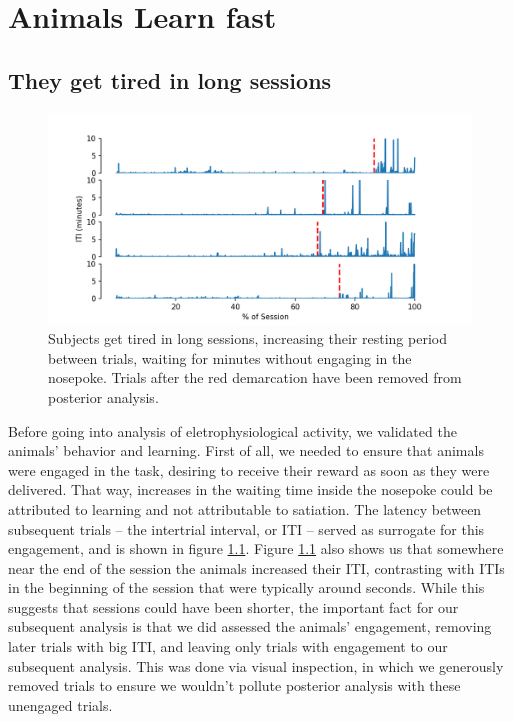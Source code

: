 \chapter{Animals Learn fast}
\label{chap:learning}

\section{They get tired in long sessions}
    \begin{figure}
        \centering
        \includegraphics[width=\textwidth]{figures/iti.png}
        \caption[Subjects get tired in long sessions]{Subjects get tired in long sessions, increasing their resting period between trials, waiting for minutes without engaging in the nosepoke. Trials after the red demarcation have been removed from posterior analysis.}
        \label{fig:iti}
    \end{figure}
    
    Before going into analysis of eletrophysiological activity, we validated the animals' behavior and learning. First of all, we needed to ensure that animals were engaged in the task, desiring to receive their reward as soon as they were delivered. That way, increases in the waiting time inside the nosepoke could be attributed to learning and not attributable to satiation. The latency between subsequent trials -- the intertrial interval, or ITI --  served as surrogate for this engagement, and is shown in figure \ref{fig:iti}. 
    Figure \ref{fig:iti} also shows us that somewhere near the end of the session the animals increased their ITI, contrasting with ITIs in the beginning of the session that were typically around seconds. While this suggests that sessions could have been shorter, the important fact for our subsequent analysis is that we did assessed the animals' engagement, removing later trials with big ITI, and leaving only trials with engagement to our subsequent analysis. This was done via visual inspection, in which we generously removed trials to ensure we wouldn't pollute posterior analysis with these unengaged trials.


